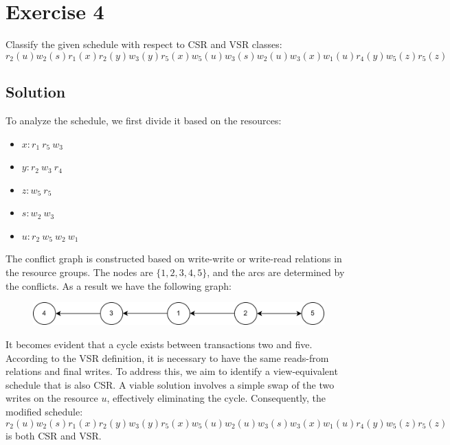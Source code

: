 \section{Exercise 4}

Classify the given schedule with respect to CSR and VSR classes:
\[r_2(u) w_2(s) r_1(x) r_2(y) w_3(y) r_5(x) w_5(u) w_3(s) w_2(u) w_3(x) w_1(u) r_4(y) w_5(z) r_5(z)\]

\subsection*{Solution}
To analyze the schedule, we first divide it based on the resources:
\begin{itemize}
    \item $x: r_1 \: r_5 \: w_3$
    \item $y: r_2 \: w_3 \: r_4$
    \item $z: w_5 \: r_5$
    \item $s: w_2 \: w_3$
    \item $u: r_2 \: w_5 \: w_2 \: w_1$
\end{itemize}
The conflict graph is constructed based on write-write or write-read relations in the resource groups. 
The nodes are $\{1,2,3,4,5\}$, and the arcs are determined by the conflicts. 
As a result we have the following graph:
\begin{figure}[H]
    \centering
    \includegraphics[width=1.0\linewidth]{images/conflictgraph1.png}
\end{figure}
It becomes evident that a cycle exists between transactions two and five. 
According to the VSR definition, it is necessary to have the same reads-from relations and final writes.
To address this, we aim to identify a view-equivalent schedule that is also CSR. 
A viable solution involves a simple swap of the two writes on the resource $u$, effectively eliminating the cycle. 
Consequently, the modified schedule:
\[r_2(u) w_2(s) r_1(x) r_2(y) w_3(y) r_5(x) w_5(u) w_2(u) w_3(s) w_3(x) w_1(u) r_4(y) w_5(z) r_5(z)\]
is both CSR and VSR.